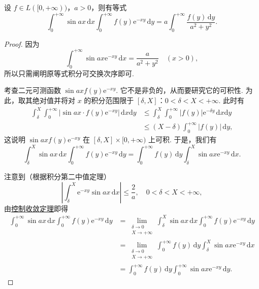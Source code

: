 \documentclass[../../main.tex]{subfiles}
\begin{document}
\begin{example}
设 \( f \in L([0, +\infty)) \)，\( a > 0 \)，则有等式
\[
\int_0^{+\infty} \sin ax \, \mathrm{d}x \int_0^{+\infty} f(y) \mathrm{e}^{-xy} \, \mathrm{d}y = a \int_0^{+\infty} \frac{f(y) \, \mathrm{d}y}{a^2 + y^2}.
\]
\end{example}
\begin{proof}
因为
\[
\int_0^{+\infty} \sin ax \mathrm{e}^{-xy} \, \mathrm{d}x = \frac{a}{a^2 + y^2} \quad (x > 0),
\]
所以只需阐明原等式积分可交换次序即可.

考查二元可测函数 \( \sin ax f(y) \mathrm{e}^{-xy} \). 它不是非负的，从而要研究它的可积性. 为此，取其绝对值并将对 \( x \) 的积分范围限于 \( [\delta, X] \)：\( 0 < \delta < X < +\infty \). 此时有
\begin{align*}
\int_{\delta}^{X} \int_0^{+\infty} |\sin ax \cdot f(y) \mathrm{e}^{-xy}| \, \mathrm{d}x\mathrm{d}y &\leqslant \int_{\delta}^{X} \int_0^{+\infty} |f(y)| \mathrm{e}^{-\delta y} \, \mathrm{d}x\mathrm{d}y \\
&\leqslant (X - \delta) \int_0^{+\infty} |f(y)| \, \mathrm{d}y,
\end{align*}
这说明 \( \sin ax f(y) \mathrm{e}^{-xy} \) 在 \( [\delta, X] \times [0, +\infty) \) 上可积. 于是，我们有
\[
\int_{\delta}^{X} \sin ax \, \mathrm{d}x \int_0^{+\infty} f(y) \mathrm{e}^{-xy} \, \mathrm{d}y = \int_0^{+\infty} f(y) \, \mathrm{d}y \int_{\delta}^{X} \sin ax \mathrm{e}^{-xy} \, \mathrm{d}x.
\]

注意到（根据积分第二中值定理）
\[
\left| \int_{\delta}^{X} \mathrm{e}^{-xy} \sin ax \, \mathrm{d}x \right| \leqslant \frac{2}{a}, \quad 0 < \delta < X < +\infty,
\]
由\hyperref[theorem:控制收敛定理]{控制收敛定理}即得
\begin{align*}
\int_0^{+\infty} \sin ax \, \mathrm{d}x \int_0^{+\infty} f(y) \mathrm{e}^{-xy} \, \mathrm{d}y &= \lim_{\substack{\delta \to 0 \\ X \to +\infty}} \int_{\delta}^{X} \sin ax \, \mathrm{d}x \int_0^{+\infty} f(y) \mathrm{e}^{-xy} \, \mathrm{d}y \\
&= \lim_{\substack{\delta \to 0 \\ X \to +\infty}} \int_0^{+\infty} f(y) \, \mathrm{d}y \int_{\delta}^{X} \sin ax \mathrm{e}^{-xy} \, \mathrm{d}x \\
&= \int_0^{+\infty} f(y) \, \mathrm{d}y \int_0^{+\infty} \sin ax \mathrm{e}^{-xy} \, \mathrm{d}y.
\end{align*}
\end{proof}
\end{document}
